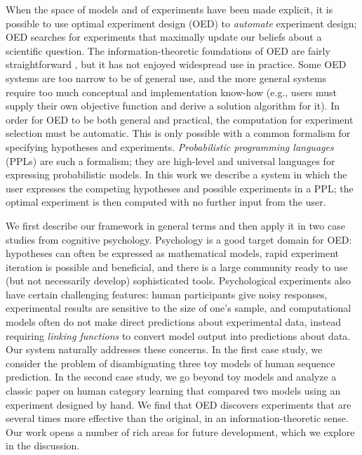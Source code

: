 \documentclass{article}
\begin{document}


When the space of models and of experiments have been made explicit, it is possible to use optimal experiment design (OED) to \emph{automate} experiment design; OED searches for experiments that maximally update our beliefs about a scientific question.
The information-theoretic foundations of OED are fairly straightforward \cite{Lindley1956}, but it has not enjoyed widespread use in practice.
Some OED systems are too narrow to be of general use, and %
the more general systems require too much conceptual and implementation know-how (e.g., users must supply their own objective function and derive a solution algorithm for it).
In order for OED to be both general and practical, the computation for experiment selection must be automatic.
This is only possible with a common formalism for specifying hypotheses and experiments.
\emph{Probabilistic programming languages} (PPLs) are such a formalism; they are high-level and universal languages for expressing probabilistic models.
In this work we describe a system in which the user expresses the competing hypotheses and possible experiments in a PPL; the optimal experiment is then computed with no further input from the user.

We first describe our framework in general terms and then apply it in two case studies from cognitive psychology.
Psychology is a good target domain for OED: hypotheses can often be expressed as mathematical models, rapid experiment iteration is possible and beneficial, and there is a large community ready to use (but not necessarily develop) sophisticated tools.
Psychological experiments also have certain challenging features: human participants give noisy responses, experimental results are sensitive to the size of one's sample, and computational models often do not make direct predictions about experimental data, instead requiring \emph{linking functions} to convert model output into predictions about data.
Our system naturally addresses these concerns.
In the first case study, we consider the problem of disambiguating three toy models of human sequence prediction.
In the second case study, we go beyond toy models and analyze a classic paper on human category learning that compared two models using an experiment designed by hand.
We find that OED discovers experiments that are several times more effective than the original, in an information-theoretic sense.
Our work opens a number of rich areas for future development, which we explore in the discussion.
\end{document}
